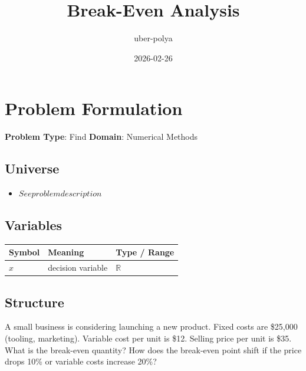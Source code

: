 \documentclass[11pt, a4paper]{article}
\title{Break-Even Analysis}
\author{uber-polya}
\date{2026-02-26}
\begin{document}
\maketitle
\tableofcontents
\newpage

\section{Problem Formulation}

\begin{polyamodel}

\textbf{Problem Type}: Find \hfill
\textbf{Domain}: Numerical Methods


\end{polyamodel}

\subsection{Universe}

\begin{itemize}
  \item $See problem description$
\end{itemize}

\subsection{Variables}

\begin{longtable}{lll}
\toprule
\textbf{Symbol} & \textbf{Meaning} & \textbf{Type / Range} \\
\midrule
\endhead
$x$ & decision variable & $\mathbb{{R}}$ \\
\bottomrule
\end{longtable}

\subsection{Structure}

A small business is considering launching a new product. Fixed costs are \$25,000 (tooling, marketing). Variable cost per unit is \$12. Selling price per unit is \$35. What is the break-even quantity? How does the break-even point shift if the price drops 10\% or variable costs increase 20\%?
\end{document}
